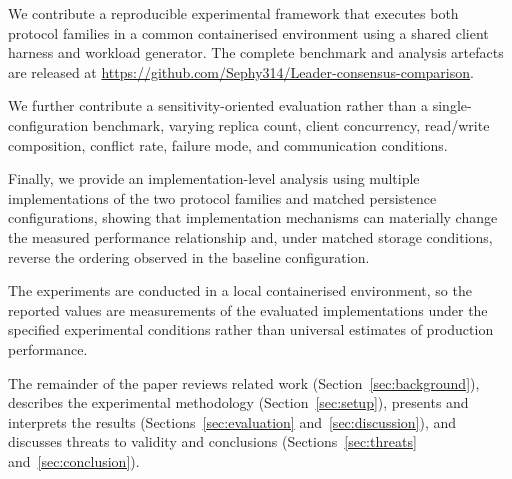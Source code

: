 We contribute a reproducible experimental framework that executes both
protocol families in a common containerised environment using a shared
client harness and workload generator. The complete benchmark and analysis
artefacts are released at
\url{https://github.com/Sephy314/Leader-consensus-comparison}.

We further contribute a sensitivity-oriented evaluation rather than a
single-configuration benchmark, varying replica count, client concurrency,
read/write composition, conflict rate, failure mode, and communication
conditions.

Finally, we provide an implementation-level analysis using multiple
implementations of the two protocol families and matched persistence
configurations, showing that implementation mechanisms can materially
change the measured performance relationship and, under matched storage
conditions, reverse the ordering observed in the baseline configuration.

The experiments are conducted in a local containerised environment, so the
reported values are measurements of the evaluated implementations under the
specified experimental conditions rather than universal estimates of
production performance.

The remainder of the paper reviews related work (Section~\ref{sec:background}),
describes the experimental methodology (Section~\ref{sec:setup}), presents and
interprets the results (Sections~\ref{sec:evaluation} and~\ref{sec:discussion}),
and discusses threats to validity and conclusions (Sections~\ref{sec:threats}
and~\ref{sec:conclusion}).
